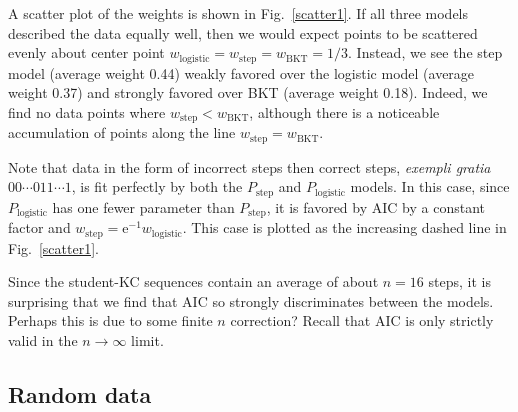 \documentclass{acmlarge-edm}
\begin{document}
A scatter plot of the weights is shown in Fig.~\ref{scatter1}.
If all three models described the data equally well, then
we would expect points to be scattered evenly about 
center point $w_\mathrm{logistic}= w_\mathrm{step}= w_\mathrm{BKT}=1/3$.
Instead, we see the step model (average weight 0.44) weakly 
favored over the logistic model (average weight 0.37) and 
strongly favored over BKT (average weight 0.18).  Indeed, we 
find no data points where $w_\mathrm{step}< w_\mathrm{BKT}$,
although there is a noticeable accumulation of points along the line 
$w_\mathrm{step}= w_\mathrm{BKT}$.

Note that data in the form of incorrect steps then correct steps, 
{\it exempli gratia} $00\cdots 011\cdots 1$,
is fit perfectly by both the $P_\mathrm{step}$ and 
$P_\mathrm{logistic}$ models.  
In this case, since $P_\mathrm{logistic}$ has one fewer parameter
than $P_\mathrm{step}$, it is favored by AIC by a constant factor and
$w_\mathrm{step}=\mathrm{e}^{-1} w_\mathrm{logistic}$.  This case is
plotted as the increasing dashed line in Fig.~\ref{scatter1}.

Since the student-KC sequences contain an average of about $n=16$ 
steps, it is surprising that we find that AIC so strongly
discriminates between the models.  Perhaps this is due to
some finite $n$ correction?  Recall that AIC is only 
strictly valid in the $n\to\infty$ limit.

\subsection{Random data}
\end{document}
